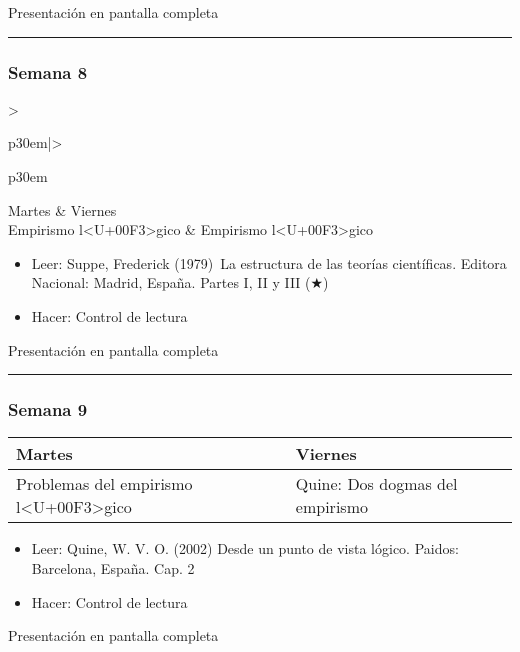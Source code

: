 \documentclass[spanish,]{article}
\begin{document}
Presentación en pantalla completa

\begin{center}\rule{0.5\linewidth}{\linethickness}\end{center}

\subsubsection{Semana 8}\label{semana-8}

\begin{tabular}{>{\raggedright\arraybackslash}p{30em}|>{\raggedright\arraybackslash}p{30em}}
\hline
Martes & Viernes\\
\hline
Empirismo l<U+00F3>gico & Empirismo l<U+00F3>gico\\
\hline
\end{tabular}

\begin{itemize}
\item
  Leer: Suppe, Frederick (1979)~La estructura de las teorías
  científicas. Editora Nacional: Madrid, España. Partes I, II y III (★)
\item
  Hacer: Control de lectura
\end{itemize}

Presentación en pantalla completa

\begin{center}\rule{0.5\linewidth}{\linethickness}\end{center}

\subsubsection{Semana 9}\label{semana-9}

\begin{tabular}{>{\raggedright\arraybackslash}p{30em}|>{\raggedright\arraybackslash}p{30em}}
\hline
Martes & Viernes\\
\hline
Problemas del empirismo l<U+00F3>gico & Quine: Dos dogmas del empirismo\\
\hline
\end{tabular}

\begin{itemize}
\item
  Leer: Quine, W. V. O. (2002) Desde un punto de vista lógico. Paidos:
  Barcelona, España. Cap. 2
\item
  Hacer: Control de lectura
\end{itemize}

Presentación en pantalla completa
\end{document}

